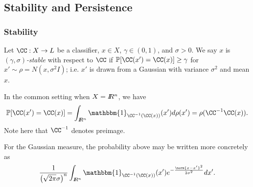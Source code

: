 \subsection{Stability and Persistence} \label{subsec:stab}

\begin{frame}
  \frametitle{Stability}
\begin{definition}
Let $\CC:X\to L$ be a classifier, $x \in X$, $\gamma\in(0,1)$, and $\sigma>0$. We say $x$ is \emph{$(\gamma,\sigma)$-stable} with respect to $\CC$ if $\mathbb{P}[\CC(x')=\CC(x)] \geq \gamma$ for $x' \sim \rho = N(x, \sigma^2 I)$; i.e. $x'$ is drawn from a Gaussian with variance $\sigma^2$ and mean $x$.
\end{definition}

 In the common setting when $X=I\!\!R^n$, we have
 \[\mathbb{P}[\CC(x')=\CC(x)] = \int_{\RR^n} \mathbbm{1}_{\CC^{-1}(\CC(x))} (x') d\rho (x') = \rho(\CC^{-1}\CC(x)).\]
 Note here that $\CC^{-1}$ denotes preimage. %

 For the Gaussian measure, the probability above may be written more concretely as
 \begin{equation}\label{EQN:Gaussian}
 \frac{1}{\left(\sqrt{2\pi}\sigma\right)^{n}} \int_{\RR^n} \mathbbm{1}_{\CC^{-1}(\CC(x))} (x')e^{-\frac{\norm{x - x'}^2}{2\sigma^2}} dx'.
 \end{equation}
\end{frame}
